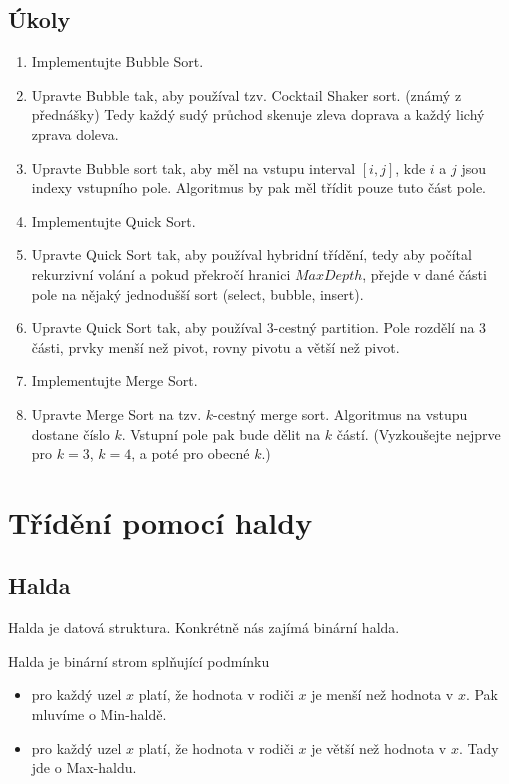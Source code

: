 \documentclass[openany,12pt,a4paper]{book}
\begin{document}
\section{Úkoly}
\begin{enumerate}
    \item Implementujte Bubble Sort.
    \item Upravte Bubble tak, aby používal tzv. Cocktail Shaker sort. (známý z přednášky)
          Tedy každý sudý průchod skenuje zleva doprava a každý lichý zprava doleva.
    \item Upravte Bubble sort tak, aby měl na vstupu interval $[i, j]$, kde $i$ a $j$ jsou indexy vstupního pole.
          Algoritmus by pak měl třídit pouze tuto část pole.
    \item Implementujte Quick Sort.
    \item Upravte Quick Sort tak, aby používal hybridní třídění, tedy aby počítal rekurzivní volání a pokud překročí hranici $MaxDepth$,
          přejde v dané části pole na nějaký jednodušší sort (select, bubble, insert).
    \item Upravte Quick Sort tak, aby používal 3-cestný partition. Pole rozdělí na 3 části, prvky menší než pivot, rovny pivotu a větší než pivot.
    \item Implementujte Merge Sort.
    \item Upravte Merge Sort na tzv. $k$-cestný merge sort. Algoritmus na vstupu dostane číslo $k$.
          Vstupní pole pak bude dělit na $k$ částí.
          (Vyzkoušejte nejprve pro $k=3$, $k=4$, a poté pro obecné $k$.)
\end{enumerate}
	


\chapter{Třídění pomocí haldy}

\section{Halda}

Halda je datová struktura. Konkrétně nás zajímá binární halda.
\begin{definition}
Halda je binární strom splňující podmínku
\begin{itemize}
	\item pro každý uzel $x$ platí, že hodnota v rodiči $x$ je menší než hodnota v $x$. 
	Pak mluvíme o Min-haldě.
	\item pro každý uzel $x$ platí, že hodnota v rodiči $x$ je větší než hodnota v $x$.
	Tady jde o Max-haldu.
\end{itemize}
\end{definition}
\end{document}
